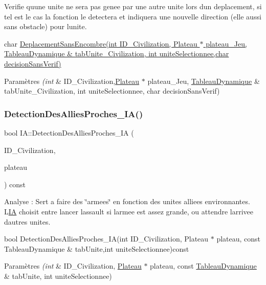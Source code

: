 Verifie qu\textquotesingle{}une unite ne sera pas genee par une autre unite lors d\textquotesingle{}un deplacement, si tel est le cas la fonction le detectera et indiquera une nouvelle direction (elle aussi sans obstacle) pour l\textquotesingle{}unite. 

char \hyperlink{classIA_a8b6cc7f5e530f40def7f0490d5a29db7}{Deplacement\+Sans\+Encombre(int I\+D\+\_\+\+Civilization, Plateau $\ast$ plateau\+\_\+\+Jeu,  Tableau\+Dynamique \& tab\+Unite\+\_\+\+Civilization, int unite\+Selectionnee,char decision\+Sans\+Verif)} 
\begin{DoxyParams}{Paramètres}
{\em (int} & I\+D\+\_\+\+Civilization,\hyperlink{classPlateau}{Plateau} $\ast$ plateau\+\_\+\+Jeu, \hyperlink{classTableauDynamique}{Tableau\+Dynamique} \& tab\+Unite\+\_\+\+Civilization, int unite\+Selectionnee, char decision\+Sans\+Verif) \\
\hline
\end{DoxyParams}
\mbox{\label{classIA_adad21c86052cc274d27fa91b379d32c4}} 
\subsubsection{\texorpdfstring{Detection\+Des\+Allies\+Proches\+\_\+\+I\+A()}{DetectionDesAlliesProches\_IA()}}
{\footnotesize\ttfamily bool I\+A\+::\+Detection\+Des\+Allies\+Proches\+\_\+\+IA (\begin{DoxyParamCaption}\item[{int}]{I\+D\+\_\+\+Civilization,  }\item[{\hyperlink{classPlateau}{Plateau} $\ast$}]{plateau }\end{DoxyParamCaption}) const}



Analyse \+: Sert a faire des \char`\"{}armees\char`\"{} en fonction des unites alliees environnantes. L\textquotesingle{}\hyperlink{classIA}{IA} choisit entre lancer l\textquotesingle{}assault si l\textquotesingle{}armee est assez grande, ou attendre l\textquotesingle{}arrivee d\textquotesingle{}autres unites. 

bool Detection\+Des\+Allies\+Proches\+\_\+\+I\+A(int I\+D\+\_\+\+Civilization, Plateau $\ast$ plateau, const Tableau\+Dynamique \& tab\+Unite,int unite\+Selectionnee)const 
\begin{DoxyParams}{Paramètres}
{\em (int} & I\+D\+\_\+\+Civilization, \hyperlink{classPlateau}{Plateau} $\ast$ plateau, const \hyperlink{classTableauDynamique}{Tableau\+Dynamique} \& tab\+Unite, int unite\+Selectionnee) \\
\hline
\end{DoxyParams}
\mbox{\label{classIA_a4085c538669bc85766eaff6bb0597539}} 
